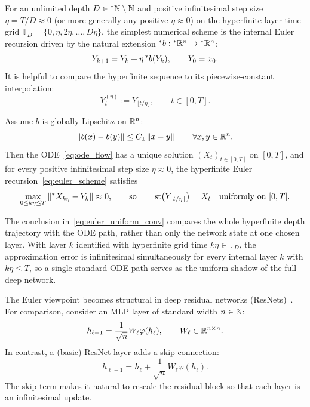 For an unlimited depth $D \in {}^*\mathbb{N} \setminus \mathbb{N}$ and positive infinitesimal step size $\eta = T/D \approx 0$ (or more generally any positive $\eta \approx 0$) on the hyperfinite layer-time grid $\mathbb{T}_D = \{0, \eta, 2\eta, \dots, D\eta\}$, the simplest numerical scheme is the internal Euler recursion driven by the natural extension ${}^*b : {}^*\mathbb{R}^n \to {}^*\mathbb{R}^n$:
\begin{equation}\label{eq:euler_scheme}
Y_{k+1} = Y_k + \eta\,{}^*b(Y_k), \qquad Y_0 = x_0.
\end{equation}
It is helpful to compare the hyperfinite sequence to its piecewise-constant interpolation:
\begin{equation}\label{eq:euler_interp}
Y_t^{(\eta)} := Y_{\lfloor t/\eta \rfloor}, \qquad t \in [0, T].
\end{equation}

\begin{theorem}\label{thm:euler_conv}
Assume $b$ is globally Lipschitz on $\mathbb{R}^n$:
\begin{equation}\label{eq:b_lipschitz}
\left\lVert b(x) - b(y) \right\rVert \le C_1 \left\lVert x - y \right\rVert \qquad \forall x, y \in \mathbb{R}^n.
\end{equation}
Then the ODE~\eqref{eq:ode_flow} has a unique solution $(X_t)_{t \in [0,T]}$ on $[0, T]$, and for every positive infinitesimal step size $\eta \approx 0$, the hyperfinite Euler recursion~\eqref{eq:euler_scheme} satisfies
\begin{equation}\label{eq:euler_uniform_conv}
\max_{0 \le k\eta \le T} \left\lVert {}^*X_{k\eta} - Y_k \right\rVert \approx 0, \qquad \text{so} \qquad \operatorname{st}\!\left(Y_{\lfloor t/\eta \rfloor}\right) = X_t \quad \text{uniformly on } [0, T].
\end{equation}
\end{theorem}

The conclusion in~\eqref{eq:euler_uniform_conv} compares the whole hyperfinite depth trajectory with the ODE path, rather than only the network state at one chosen layer. With layer $k$ identified with hyperfinite grid time $k\eta \in \mathbb{T}_D$, the approximation error is infinitesimal simultaneously for every internal layer $k$ with $k\eta \le T$, so a single standard ODE path serves as the uniform shadow of the full deep network.

The Euler viewpoint becomes structural in deep residual networks (ResNets)~\cite{he2016deep}.
For comparison, consider an MLP layer of standard width $n \in \mathbb{N}$:
\begin{equation}\label{eq:mlp_layer}
h_{\ell+1} = \frac{1}{\sqrt{n}} W_\ell \varphi(h_\ell), \qquad W_\ell \in \mathbb{R}^{n \times n}.
\end{equation}
In contrast, a (basic) ResNet layer adds a skip connection:
\begin{equation}\label{eq:resnet_layer}
h_{\ell+1} = h_\ell + \frac{1}{\sqrt{n}} W_\ell \varphi(h_\ell).
\end{equation}
The skip term makes it natural to rescale the residual block so that each layer is an infinitesimal update.

